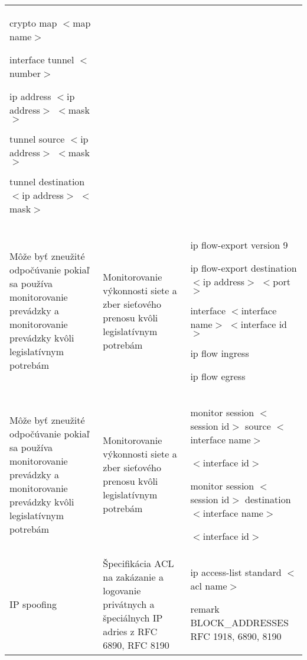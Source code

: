 \begin{longtable}[!htbp]{|L{10em}L{10em}>{\selectfont}L{34em}|}
	\hspace{0.5em}crypto map $<$map name$>$
	
	interface tunnel $<$number$>$
	
	\hspace{0.5em}ip address $<$ip address$>$ $<$mask$>$
	
	\hspace{0.5em}tunnel source $<$ip address$>$ $<$mask$>$
	
	\hspace{0.5em}tunnel destination $<$ip address$>$ $<$mask$>$\\
	
	
	
	
	Môže byť zneužité odpočúvanie pokiaľ sa používa monitorovanie prevádzky a monitorovanie prevádzky kvôli legislatívnym potrebám	&Monitorovanie výkonnosti siete a zber sieťového prenosu kvôli legislatívnym potrebám	&ip flow-export version 9
	
	
	ip flow-export destination $<$ip address$>$ $<$port$>$
	
	interface $<$interface name$>$ $<$interface id$>$
	
	\hspace{0.5em}ip flow ingress
	
	\hspace{0.5em}ip flow egress\\
	
	
	
	
	 Môže byť zneužité odpočúvanie pokiaľ sa používa monitorovanie prevádzky a monitorovanie prevádzky kvôli legislatívnym potrebám	&Monitorovanie výkonnosti siete a zber sieťového prenosu kvôli legislatívnym potrebám	&monitor session $<$session id$>$ source $<$interface name$>$ 
	
	\hspace{0.5em}$<$interface id$>$
	
	monitor session $<$session id$>$ destination $<$interface name$>$ 
	
	\hspace{0.5em}$<$interface id$>$\\
	
	
	
	
	IP spoofing	&Špecifikácia ACL na zakázanie a logovanie privátnych a špeciálnych IP adries z RFC 6890, RFC 8190	&ip access-list standard $<$acl name$>$
	
	\hspace{0.5em}remark BLOCK\_ADDRESSES RFC 1918, 6890, 8190
	

\end{longtable}
